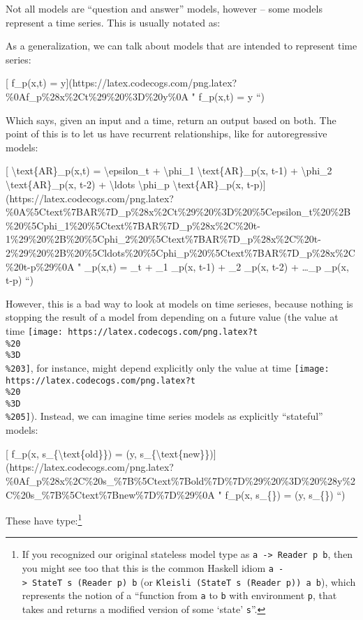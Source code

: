 \documentclass[]{article}
\begin{document}
Not all models are ``question and answer'' models, however -- some models
represent a time series. This is usually notated as:

As a generalization, we can talk about models that are intended to represent
time series:

{[} f\_p(x,t) =
y{]}(https://latex.codecogs.com/png.latex?\%0Af\_p\%28x\%2Ct\%29\%20\%3D\%20y\%0A
" f\_p(x,t) = y ``)

Which says, given an input and a time, return an output based on both. The point
of this is to let us have recurrent relationships, like for autoregressive
models:

{[} \textbackslash{}text\{AR\}\_p(x,t) = \textbackslash{}epsilon\_t +
\textbackslash{}phi\_1 \textbackslash{}text\{AR\}\_p(x, t-1) +
\textbackslash{}phi\_2 \textbackslash{}text\{AR\}\_p(x, t-2) +
\textbackslash{}ldots \textbackslash{}phi\_p \textbackslash{}text\{AR\}\_p(x,
t-p){]}(https://latex.codecogs.com/png.latex?\%0A\%5Ctext\%7BAR\%7D\_p\%28x\%2Ct\%29\%20\%3D\%20\%5Cepsilon\_t\%20\%2B\%20\%5Cphi\_1\%20\%5Ctext\%7BAR\%7D\_p\%28x\%2C\%20t-1\%29\%20\%2B\%20\%5Cphi\_2\%20\%5Ctext\%7BAR\%7D\_p\%28x\%2C\%20t-2\%29\%20\%2B\%20\%5Cldots\%20\%5Cphi\_p\%20\%5Ctext\%7BAR\%7D\_p\%28x\%2C\%20t-p\%29\%0A
" \_p(x,t) = \epsilon\_t + \phi\_1 \_p(x, t-1) + \phi\_2
\_p(x, t-2) + \ldots \phi\_p \_p(x, t-p) ``)

However, this is a bad way to look at models on time serieses, because nothing
is stopping the result of a model from depending on a future value (the value at
time \texttt{[image: https://latex.codecogs.com/png.latex?t\\\%20\\\%3D\\\%203]}, for
instance, might depend explicitly only the value at time
\texttt{[image: https://latex.codecogs.com/png.latex?t\\\%20\\\%3D\\\%205]}). Instead,
we can imagine time series models as explicitly ``stateful'' models:

{[} f\_p(x, s\_\{\textbackslash{}text\{old\}\}) = (y,
s\_\{\textbackslash{}text\{new\}\}){]}(https://latex.codecogs.com/png.latex?\%0Af\_p\%28x\%2C\%20s\_\%7B\%5Ctext\%7Bold\%7D\%7D\%29\%20\%3D\%20\%28y\%2C\%20s\_\%7B\%5Ctext\%7Bnew\%7D\%7D\%29\%0A
" f\_p(x, s\_\{\}) = (y, s\_\{\}) ``)

These have type:\footnote{If you recognized our original stateless model type as
  \texttt{a\ -\textgreater{}\ Reader\ p\ b}, then you might see too that this is
  the common Haskell idiom
  \texttt{a\ -\textgreater{}\ StateT\ s\ (Reader\ p)\ b} (or
  \texttt{Kleisli\ (StateT\ s\ (Reader\ p))\ a\ b}), which represents the notion
  of a ``function from \texttt{a} to \texttt{b} with environment \texttt{p},
  that takes and returns a modified version of some `state' \texttt{s}''.}
\end{document}
